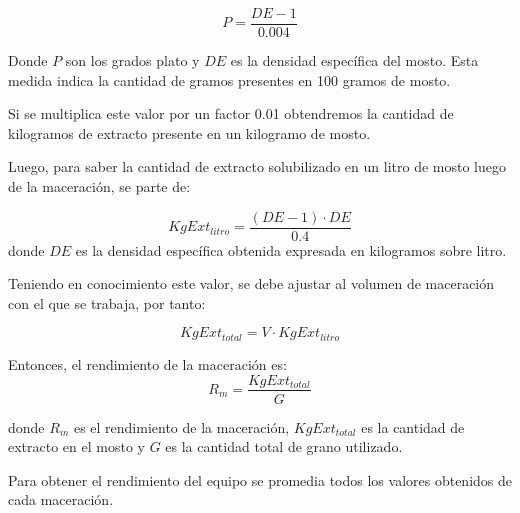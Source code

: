                 \begin{equation}
                    P = \frac{DE -1}{0.004}
                \end{equation}
                
                \par Donde $P$ son los grados plato y $DE$ es la densidad específica del mosto. Esta medida indica la cantidad de gramos presentes en 100 gramos de mosto. 
                \par Si se multiplica este valor por un factor 0.01  obtendremos la cantidad de kilogramos de extracto presente en un kilogramo de mosto.
                
                \par Luego, para saber la cantidad de extracto solubilizado en un litro de mosto luego de la maceración, se parte de:
                    
                    \begin{equation}
                        KgExt_{litro} = \frac{(DE-1) \cdot DE}{0.4}
                    \end{equation}
                    donde $DE$ es la densidad específica obtenida expresada en kilogramos sobre litro.
                    
                    \par Teniendo en conocimiento este valor, se debe ajustar al volumen de maceración con el que se trabaja, por tanto:
                    
                    \begin{equation}
                        KgExt_{total} = V \cdot KgExt_{litro}
                        \label{EcuacionExtractoTotal}
                    \end{equation}
                
                Entonces, el rendimiento de la maceración es:
                \begin{equation}
                    R_m = \frac{KgExt_{total}}{G}
                    \label{EcuacionRendimientoMaceracion}
                \end{equation}
                
                \par donde $R_m$ es el rendimiento de la maceración, $KgExt_{total}$ es la cantidad de extracto en el mosto y $G$ es la cantidad total de grano utilizado.
                
                \par Para obtener el rendimiento del equipo se promedia todos los valores obtenidos de cada maceración.
    
